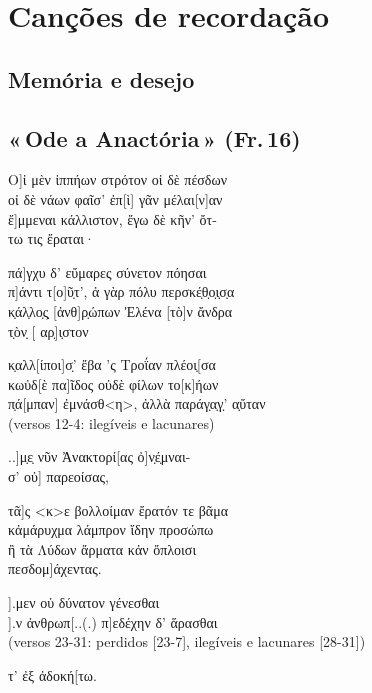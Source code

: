 \chapter{Canções de recordação}

\section{Memória e desejo}

\section{«\,Ode a Anactória\,» (Fr.\,16)}

\begin{gkverse}
Ο]ἰ μὲν ἰππήων στρότον οἰ δὲ πέσδων\\
οἰ δὲ νάων φαῖσ’ ἐπ[ὶ] γᾶν μέλαι[ν]αν\\
ἔ]μμεναι κάλλιστον, ἔγω δὲ κῆν’ ὄτ-\\
τω τις ἔραται·

πά]γχυ δ’ εὔμαρες σύνετον πόησαι\\
π]άντι τ[ο]ῦ̣τ’, ἀ γὰρ πόλυ περσκέ̣θ̣ο̣ι̣σ̣α\\
κ̣άλ̣λο̣ς̣ [ἀνθ]ρ̣ώπων Ἐλένα [τὸ]ν ἄνδρα\\
τ̣ὸν̣ [    αρ̣]ι̣στον

κ̣αλλ[ίποι]σ̣’ ἔβα ’ς Τροΐαν πλέοι̣[σα\\
κωὐδ[ὲ πα]ῖδος οὐδὲ φίλων το[κ]ήων\\
π̣ά[μπαν] ἐμνάσθ<η>, ἀλλὰ παράγ̣α̣γ̣’ α̣ὔταν\\

\textnormal{(versos 12-4: ilegíveis e lacunares)}

..]μ̣ε̣ νῦν Ἀνακτορί[ας ὀ]ν̣έ̣μναι-\\
σ’ οὐ] παρεοίσας,

τᾶ]ς <κ>ε βολλοίμαν ἔρατόν τε βᾶμα\\
κἀμάρυχμα λάμπρον ἴδην προσώπω\\
ἢ τὰ Λύδων ἄρματα κἀν ὄπλοισι\\
πεσδομ]άχεντας.

			   ].μεν οὑ δύνατον γένεσθαι\\
		   ].ν ἀνθρωπ[..(.) π]εδέχην δ’ ἅρασθαι\\

	\textnormal{(versos 23-31: perdidos [23-7], ilegíveis e lacunares [28-31])}

     τ’ ἐξ ἀδοκή[τω.
\end{gkverse}

\chapter*{}
